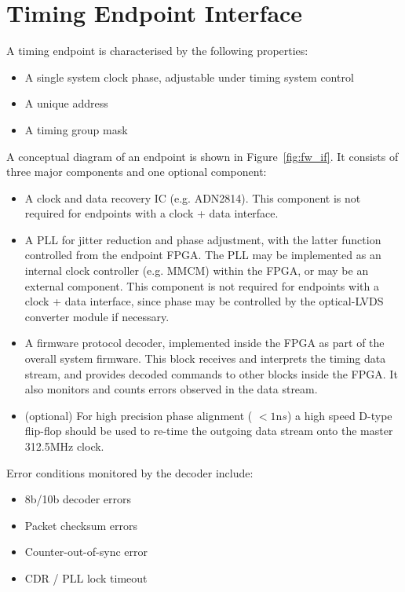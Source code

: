 \documentclass{dune}
\begin{document}
\section{Timing Endpoint Interface}

A timing endpoint is characterised by the following properties:

\begin{itemize}
	\item A single system clock phase, adjustable under timing system control
	\item A unique address
	\item A timing group mask
\end{itemize}

A conceptual diagram of an endpoint is shown in Figure~\ref{fig:fw_if}. It consists of three major components and one optional component:

\begin{itemize}
	\item A clock and data recovery IC (e.g. ADN2814). This component is not required for endpoints with a clock + data interface.
	\item A PLL for jitter reduction and phase adjustment, with the latter function controlled from the endpoint FPGA. The PLL may be implemented as an internal clock controller (e.g. MMCM) within the FPGA, or may be an external component. This component is not required for endpoints with a clock + data interface, since phase may be controlled by the optical-LVDS converter module if necessary.
	\item A firmware protocol decoder, implemented inside the FPGA as part of the overall system firmware. This block receives and interprets the timing data stream, and provides decoded commands to other blocks inside the FPGA. It also monitors and counts errors observed in the data stream.
	\item(optional) For high precision phase alignment ( $< 1{\mathrm ns}$) a high speed D-type flip-flop should be used to re-time the outgoing data stream onto the master 312.5MHz clock.
\end{itemize}

Error conditions monitored by the decoder include:

\begin{itemize}
	\item 8b/10b decoder errors
	\item Packet checksum errors
	\item Counter-out-of-sync error
	\item CDR / PLL lock timeout
\end{itemize}
\end{document}
